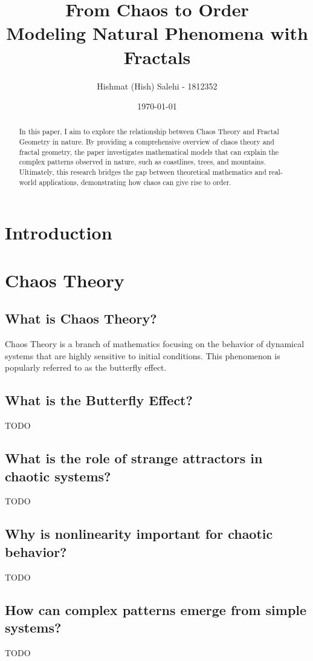 \documentclass[12pt]{article}
\title{From Chaos to Order\\
       \large Modeling Natural Phenomena with Fractals}
\author{Hishmat (Hish) Salehi - 1812352}
\date{\today}
\begin{document}
\maketitle

\begin{abstract}
In this paper, I aim to explore the relationship between Chaos Theory and Fractal Geometry in nature. By providing a comprehensive overview of chaos theory and fractal geometry, the paper investigates mathematical models that can explain the complex patterns observed in nature, such as coastlines, trees, and mountains. Ultimately, this research bridges the gap between theoretical mathematics and real-world applications, demonstrating how chaos can give rise to order.
\end{abstract}

\tableofcontents

\section{Introduction}

\section{Chaos Theory}
\subsection{What is Chaos Theory?}
Chaos Theory is a branch of mathematics focusing on the behavior of dynamical systems that are highly sensitive to initial conditions. This phenomenon is popularly referred to as the butterfly effect.

\subsection{What is the Butterfly Effect?}
TODO

\subsection{What is the role of strange attractors in chaotic systems?}
TODO

\subsection{Why is nonlinearity important for chaotic behavior?}
TODO

\subsection{How can complex patterns emerge from simple systems?}
TODO
\end{document}
